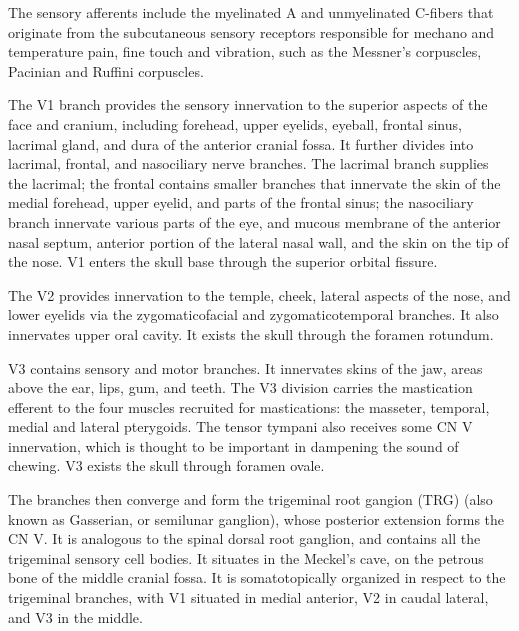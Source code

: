 The sensory afferents include the myelinated A and unmyelinated C-fibers that originate from the subcutaneous sensory receptors responsible for mechano and temperature pain, fine touch and vibration, such as the Messner's corpuscles, Pacinian and Ruffini corpuscles. 

The V1 branch provides the sensory innervation to the superior aspects of the face and cranium, including forehead, upper eyelids, eyeball, frontal sinus, lacrimal gland, and dura of the anterior cranial fossa. It further divides into lacrimal, frontal, and nasociliary nerve branches. The lacrimal branch supplies the lacrimal; the frontal contains smaller branches that innervate the skin of the medial forehead, upper eyelid, and parts of the frontal sinus; the nasociliary branch innervate various parts of the eye, and mucous membrane of the anterior nasal septum, anterior portion of the lateral nasal wall, and the skin on the tip of the nose. V1 enters the skull base through the superior orbital fissure.  

The V2 provides innervation to the temple, cheek, lateral aspects of the nose, and lower eyelids via the zygomaticofacial and zygomaticotemporal branches. It also innervates upper oral cavity. It exists the skull through the foramen rotundum. 

V3 contains sensory and motor branches. It innervates skins of the jaw, areas above the ear, lips, gum, and teeth. The V3 division carries the mastication efferent to the four muscles recruited for mastications: the masseter, temporal, medial and lateral pterygoids. The tensor tympani also receives some CN V innervation, which is thought to be important in dampening the sound of chewing. V3 exists the skull through foramen ovale. 

The branches then converge and form the trigeminal root gangion (TRG) (also known as Gasserian, or semilunar ganglion), whose posterior extension forms the CN V. It is analogous to the spinal dorsal root ganglion, and contains all the trigeminal sensory cell bodies. It situates in the Meckel's cave, on the petrous bone of the middle cranial fossa. It is somatotopically organized in respect to the trigeminal branches, with V1 situated in medial anterior, V2 in caudal lateral, and V3 in the middle.

